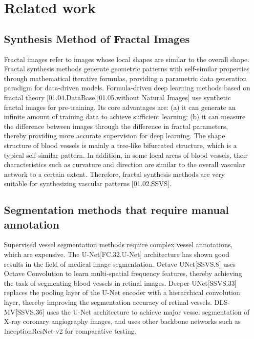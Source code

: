 \section{Related work}
\label{sec:formatting}

\subsection{Synthesis Method of Fractal Images}

Fractal images refer to images whose local shapes are similar to the overall shape. Fractal synthesis methods generate geometric patterns with self-similar properties through mathematical iterative formulas, providing a parametric data generation paradigm for data-driven models. Formula-driven deep learning methods based on fractal theory [01.04.DataBase][01.05.without Natural Images] use synthetic fractal images for pre-training. Its core advantages are: (a) it can generate an infinite amount of training data to achieve sufficient learning; (b) it can measure the difference between images through the difference in fractal parameters, thereby providing more accurate supervision for deep learning. The shape structure of blood vessels is mainly a tree-like bifurcated structure, which is a typical self-similar pattern. In addition, in some local areas of blood vessels, their characteristics such as curvature and direction are similar to the overall vascular network to a certain extent. Therefore, fractal synthesis methods are very suitable for synthesizing vascular patterns [01.02.SSVS].

\subsection{Segmentation methods that require manual annotation}

Supervised vessel segmentation methods require complex vessel annotations, which are expensive. The U-Net[FC.32.U-Net] architecture has shown good results in the field of medical image segmentation. Octave UNet[SSVS.8] uses Octave Convolution to learn multi-spatial frequency features, thereby achieving the task of segmenting blood vessels in retinal images. Deeper UNet[SSVS.33] replaces the pooling layer of the U-Net encoder with a hierarchical convolution layer, thereby improving the segmentation accuracy of retinal vessels. DLS-MV[SSVS.36] uses the U-Net architecture to achieve major vessel segmentation of X-ray coronary angiography images, and uses other backbone networks such as InceptionResNet-v2 for comparative testing.

